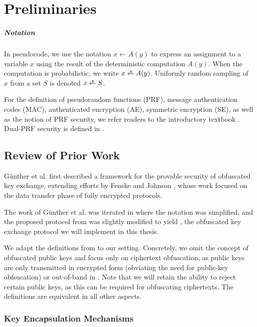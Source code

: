 \chapter{Preliminaries}\label{ch:preliminaries}

\paragraph{Notation}
In pseudocode, we use the notation $x \gets A(y)$ to express an assignment to a variable $x$ using the result of the deterministic computation $A(y)$. When the computation is probabilistic, we write $x \getsr A(y)$.
Uniformly random sampling of $x$ from a set $S$ is denoted $x \getsr S$.

For the definition of pseudorandom functions (PRF), message authentication codes (MAC), authenticated encryption (AE), symmetric encryption (SE), as well as the notion of PRF security, we refer readers to the introductory textbook \cite{katz_lindell}.
Dual-PRF security is defined in \cite[Section~7.1]{CCS:GunSteVei24}.

\section{Review of Prior Work} \label{sec:review-gsv24}

Günther et al. \cite{CCS:GunSteVei24} first described a framework for the provable security of obfuscated key exchange, extending efforts by Fenske and Johnson \cite{CCS:FenJoh24}, whose work focused on the data transfer phase of fully encrypted protocols.

The work of Günther et al. was iterated in \cite{EPRINT:GRSV25} where the notation was simplified, and the proposed protocol from \cite{CCS:GunSteVei24} was slightly modified to yield \drivel{}, the obfuscated key exchange protocol we will implement in this thesis.

We adapt the definitions from \cite{CCS:GunSteVei24,EPRINT:GRSV25} to our setting. Concretely, we omit the concept of obfuscated public keys and focus only on ciphertext obfuscation, as public keys are only transmitted in encrypted form (obviating the need for public-key obfsucation) or out-of-band in \drivel{}. Note that we will retain the ability to reject certain public keys, as this can be required for obfuscating ciphertexts. The definitions are equivalent in all other aspects.

\subsection{Key Encapsulation Mechanisms}


